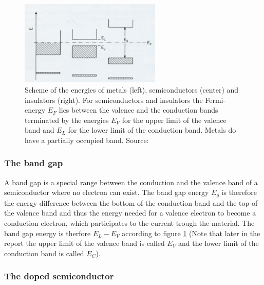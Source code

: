 \documentclass[a4paper]{article}
\begin{document}
\begin{figure}
\captionsetup{singlelinecheck=off}
\centering
\includegraphics[width=0.6\textwidth]{img/scheme.jpg}
\caption[blubb]{Scheme of the energies of metals (left), semiconductors (center) and insulators (right). For semiconductors and insulators the Fermi-energy $E_F$ lies between the valence and the conduction bands terminated by the energies $E_V$ for the upper limit of the valence band and $E_L$ for the lower limit of the conduction band. Metals do have a partially occupied band. Source: \cite{esslin2018}}
\label{fig:scheme}
\end{figure}

\subsubsection{The band gap}

A band gap is a special range between the conduction and the valence band of a semiconductor where no electron can exist. The band gap energy $E_g$ is therefore the energy difference between the bottom of the conduction band and the top of the valence band and thus the energy needed for a valence electron to become a conduction electron, which participates to the current trough the material. The band gap energy is therfore $E_L - E_V$ according to figure \ref{fig:scheme} (Note that later in the report the upper limit of the valence band is called $E_V$ and the lower limit of the conduction band is called $E_C$).

\subsubsection{The doped semiconductor}
\end{document}
